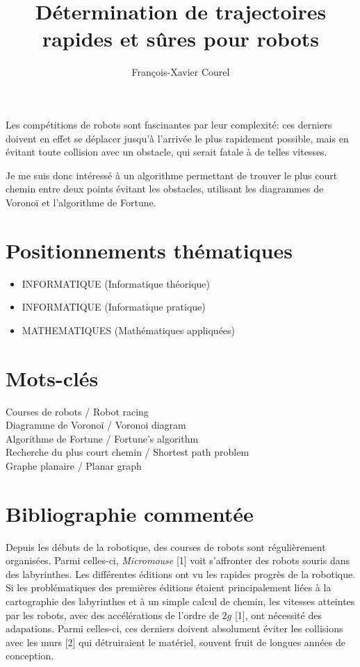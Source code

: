 \documentclass[a4paper]{article}
\title{\textbf{Détermination de trajectoires rapides et sûres pour robots}}
\author{François-Xavier Courel}
\date{}
\begin{document}
\maketitle
Les compétitions de robots sont fascinantes par leur complexité: ces derniers doivent en effet se déplacer jusqu'à l'arrivée le plus rapidement possible, mais en évitant toute collision avec un obstacle, qui serait fatale à de telles vitesses.

Je me suis donc intéressé à un algorithme permettant de trouver le plus court chemin entre deux points évitant les obstacles, utilisant les diagrammes de Voronoï et l'algorithme de Fortune.


\section*{Positionnements thématiques}
\begin{itemize}
    \item INFORMATIQUE (Informatique théorique)
    \item INFORMATIQUE (Informatique pratique)
    \item MATHEMATIQUES (Mathématiques appliquées)
\end{itemize}


\section*{Mots-clés}
\noindent Courses de robots / Robot racing \\
Diagramme de Voronoï / Voronoi diagram \\
Algorithme de Fortune / Fortune's algorithm \\
Recherche du plus court chemin / Shortest path problem \\
Graphe planaire / Planar graph


\section*{Bibliographie commentée}
Depuis les débuts de la robotique, des courses de robots sont régulièrement organisées.
Parmi celles-ci, \textit{Micromouse} [1] voit s'affronter des robots souris dans des labyrinthes.
Les différentes éditions ont vu les rapides progrès de la robotique.
Si les problématiques des premières éditions étaient principalement liées à la cartographie des labyrinthes et à un simple calcul de chemin,
les vitesses atteintes par les robots, avec des accélérations de l'ordre de \(2g\) [1], ont nécessité des adapations. Parmi celles-ci, ces derniers doivent absolument éviter les collisions avec les murs [2] qui détruiraient le matériel, souvent fruit de longues années de conception.
\end{document}
